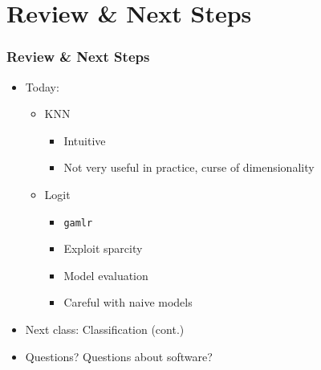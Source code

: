 \documentclass[
  shownotes,
  xcolor={svgnames},
  hyperref={colorlinks,citecolor=DarkBlue,linkcolor=DarkRed,urlcolor=DarkBlue}
  , aspectratio=169]{beamer}
\begin{document}
\section{Review \& Next Steps}
\begin{frame}
\frametitle{Review \& Next Steps}
  
\begin{itemize} 
    \item Today:
    \medskip
    \begin{itemize} 
      \item KNN
        \begin{itemize}  
            \item Intuitive
            \item Not very useful in practice, curse of dimensionality
        \end{itemize}      
     \medskip   
    \item Logit
    \begin{itemize}  
            \item \texttt{gamlr}
            \item Exploit sparcity
            \item Model evaluation
            \item Careful with naive models
        \end{itemize}      


    \end{itemize}
    \bigskip  
  \item  Next class:  Classification (cont.)


\bigskip  
\item Questions? Questions about software? 

\end{itemize}
\end{frame}
\end{document}
